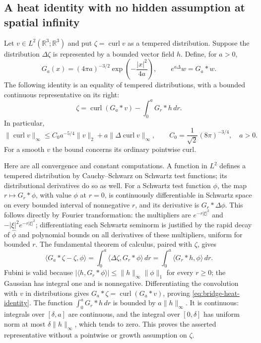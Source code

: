\subsection{A heat identity with no hidden assumption at spatial infinity}

Let $v\in L^2(\mathbb R^3;\mathbb R^3)$ and put
$\zeta=\operatorname{curl}v$ as a tempered distribution.  Suppose the
distribution $\Delta\zeta$ is represented by a bounded vector field $h$.
Define, for $a>0$,
\[
 G_a(x)=(4\pi a)^{-3/2}\exp\left(-\frac{|x|^2}{4a}\right),
 \qquad e^{a\Delta}w=G_a*w.
\]
The following identity is an equality of tempered distributions, with a
bounded continuous representative on its right:
\begin{equation}\label{eq:bridge-heat-identity}
 \zeta=\operatorname{curl}(G_a*v)
                 -\int_0^a G_r*h\,dr.
\end{equation}
In particular,
\begin{equation}\label{eq:bridge-heat-bound}
 \|\operatorname{curl}v\|_\infty
 \le C_0a^{-5/4}\|v\|_2+a\|\Delta\operatorname{curl}v\|_\infty,
 \qquad C_0=\frac{1}{\sqrt2}(8\pi)^{-3/4},\quad a>0.
\end{equation}
For a smooth $v$ the bound concerns its ordinary pointwise curl.

Here are all convergence and constant computations.  A function in $L^2$
defines a tempered distribution by Cauchy--Schwarz on Schwartz test
functions; its distributional derivatives do so as well.  For a Schwartz
test function $\phi$, the map $r\mapsto G_r*\phi$, with value $\phi$
at $r=0$, is continuously differentiable in Schwartz space on every
bounded interval of nonnegative $r$, and its derivative is
$G_r*\Delta\phi$.  This follows directly by Fourier transformation:
the multipliers are $e^{-r|\xi|^2}$ and
$-|\xi|^2e^{-r|\xi|^2}$; differentiating each Schwartz seminorm is
justified by the rapid decay of $\widehat\phi$ and polynomial bounds
on all derivatives of these multipliers, uniform for bounded $r$.
The fundamental theorem of calculus, paired with $\zeta$, gives
\[
 \langle G_a*\zeta-\zeta,\phi\rangle
       =\int_0^a\langle\Delta\zeta,G_r*\phi\rangle\,dr
       =\int_0^a\langle G_r*h,\phi\rangle\,dr.
\]
Fubini is valid because
$|\langle h,G_r*\phi\rangle|
 \le\|h\|_\infty\|\phi\|_1$ for every $r\ge0$;
the Gaussian has integral one and is nonnegative.
Differentiating the convolution with $v$ in distributions gives
$G_a*\zeta=\operatorname{curl}(G_a*v)$, proving
\eqref{eq:bridge-heat-identity}.  The function
$\int_0^aG_r*h\,dr$ is bounded by $a\|h\|_\infty$.
It is continuous: integrals over $[\delta,a]$ are continuous, and the
integral over $[0,\delta]$ has uniform norm at most
$\delta\|h\|_\infty$, which tends to zero.  This proves the asserted
representative without a pointwise or growth assumption on $\zeta$.


